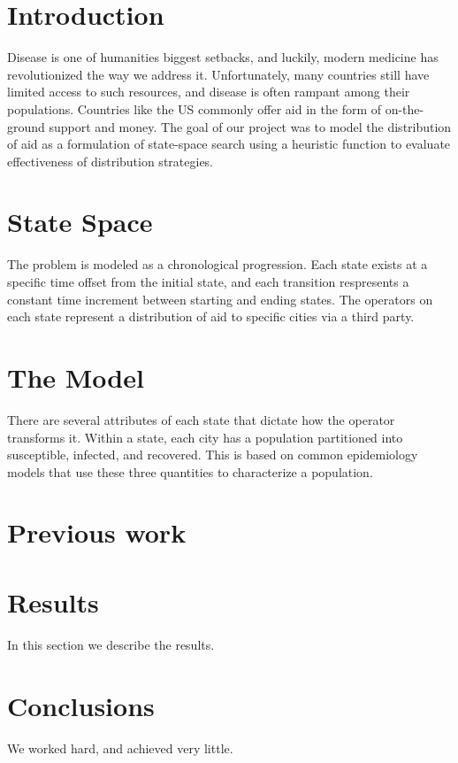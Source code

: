 \documentclass[12pt]{article}
\begin{document}
\maketitle

\section*{Introduction}
Disease is one of humanities biggest setbacks, and luckily, modern medicine
has revolutionized the way we address it. Unfortunately, many countries still
have limited access to such resources, and disease is often rampant among their
populations. Countries like the US commonly offer aid in the form of
on-the-ground support and money. The goal of our project was to model the
distribution of aid as a formulation of state-space search using a heuristic
function to evaluate effectiveness of distribution strategies. 

\section*{State Space}
The problem is modeled as a chronological progression. Each state exists at a
specific time offset from the initial state, and each transition respresents a
constant time increment between starting and ending states. The operators on
each state represent a distribution of aid to specific cities via a third party.
\section*{The Model}
There are several attributes of each state that dictate how the operator
transforms it. Within a state, each city has a population partitioned into
susceptible, infected, and recovered. This is based on common epidemiology
models that use these three quantities to characterize a population. 

\section*{Previous work}

\section*{Results}
In this section we describe the results.

\section*{Conclusions}
We worked hard, and achieved very little.
\end{document}
